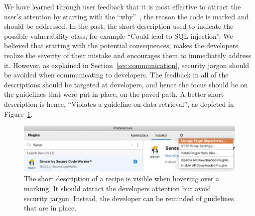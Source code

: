 We have learned through user feedback that it is most effective to attract the user's attention by starting with the “why”~\cite{RSAvideo}, the reason the code is marked and should be addressed.
In the past, the short description used to indicate the possible vulnerability class, for example “Could lead to SQL injection”. 
We believed that starting with the potential consequences, makes the developers realize the severity of their mistake and encourages them to immediately address it.
However, as explained in Section~\ref{sec:communication}, security jargon should be avoided when communicating to developers.
The feedback in all of the descriptions should be targeted at developers, and hence the focus should be on the guidelines that were put in place, on the paved path.
A better short description is hence, “Violates a guideline on data retrieval”, as depicted in Figure~\ref{fig:shortdescription}.

\begin{figure}
  \centering
  \includegraphics[width=\textwidth,page=14]{04-tools/figures/figures2.pdf}
  \caption[Short description of a recipe]{The short description of a recipe is visible when hovering over a marking. It should attract the developers attention but avoid security jargon. Instead, the developer can be reminded of guidelines that are in place.}
  \label{fig:shortdescription} 
\end{figure}

